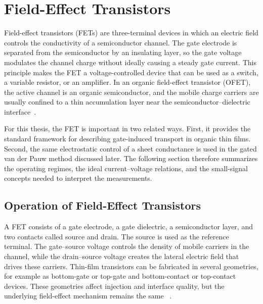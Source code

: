 \section{Field-Effect Transistors}

Field-effect transistors (FETs) are three-terminal devices in which an electric
field controls the conductivity of a semiconductor channel. The gate electrode is
separated from the semiconductor by an insulating layer, so the gate voltage
modulates the channel charge without ideally causing a steady gate current. This
principle makes the FET a voltage-controlled device that can be used as a
switch, a variable resistor, or an amplifier. In an organic field-effect
transistor (OFET), the active channel is an organic semiconductor, and the mobile
charge carriers are usually confined to a thin accumulation layer near the
semiconductor--dielectric interface~\cite{Sirringhaus2005DevicePhysics,Bruetting2005}.

For this thesis, the FET is important in two related ways. First, it provides the
standard framework for describing gate-induced transport in organic thin films.
Second, the same electrostatic control of a sheet conductance is used in the
gated van der Pauw method discussed later. The following section therefore
summarizes the operating regimes, the ideal current--voltage relations, and the
small-signal concepts needed to interpret the measurements.

\subsection{Operation of Field-Effect Transistors}

A FET consists of a gate electrode, a gate dielectric, a semiconductor layer, and
two contacts called source and drain. The source is used as the reference
terminal. The gate--source voltage controls the density of mobile carriers in the
channel, while the drain--source voltage creates the lateral electric field that
drives these carriers. Thin-film transistors can be fabricated in several
geometries, for example as bottom-gate or top-gate and bottom-contact or
top-contact devices. These geometries affect injection and interface quality, but
the underlying field-effect mechanism remains the same
~\cite{Sirringhaus2005DevicePhysics,Natali2012ChargeInjection}.



